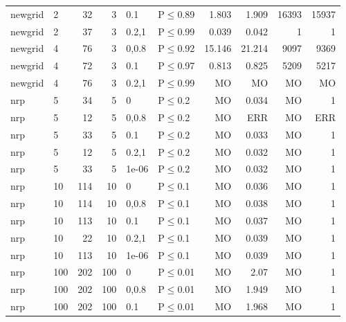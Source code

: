 \begin{longtable}{llrrllrrrr}
 newgrid       & 2        &     	32 &   3 & 0.1   & P$\leq$0.89  & 1.803    & 1.909   & 16393   & 15937   \\
 newgrid       & 2        &     	37 &   3 & 0.2,1 & P$\leq$0.99  & 0.039    & 0.042   & 1       & 1       \\
 newgrid       & 4        &     	76 &   3 & 0,0.8 & P$\leq$0.92  & 15.146   & 21.214  & 9097    & 9369    \\
 newgrid       & 4        &     	72 &   3 & 0.1   & P$\leq$0.97  & 0.813    & 0.825   & 5209    & 5217    \\
 newgrid       & 4        &     	76 &   3 & 0.2,1 & P$\leq$0.99  & MO       & MO      & MO      & MO      \\
 nrp           & 5        &     	34 &   5 & 0     & P$\leq$0.2   & MO       & 0.034   & MO      & 1       \\
 nrp           & 5        &     	12 &   5 & 0,0.8 & P$\leq$0.2   & MO       & ERR     & MO      & ERR     \\
 nrp           & 5        &     	33 &   5 & 0.1   & P$\leq$0.2   & MO       & 0.033   & MO      & 1       \\
 nrp           & 5        &     	12 &   5 & 0.2,1 & P$\leq$0.2   & MO       & 0.032   & MO      & 1       \\
 nrp           & 5        &     	33 &   5 & 1e-06 & P$\leq$0.2   & MO       & 0.032   & MO      & 1       \\
 nrp           & 10       &    	114 &  10 & 0     & P$\leq$0.1   & MO       & 0.036   & MO      & 1       \\
 nrp           & 10       &    	114 &  10 & 0,0.8 & P$\leq$0.1   & MO       & 0.038   & MO      & 1       \\
 nrp           & 10       &    	113 &  10 & 0.1   & P$\leq$0.1   & MO       & 0.037   & MO      & 1       \\
 nrp           & 10       &     	22 &  10 & 0.2,1 & P$\leq$0.1   & MO       & 0.039   & MO      & 1       \\
 nrp           & 10       &    	113 &  10 & 1e-06 & P$\leq$0.1   & MO       & 0.039   & MO      & 1       \\
 nrp           & 100      &    	202 & 100 & 0     & P$\leq$0.01  & MO       & 2.07    & MO      & 1       \\
 nrp           & 100      &    	202 & 100 & 0,0.8 & P$\leq$0.01  & MO       & 1.949   & MO      & 1       \\
 nrp           & 100      &    	202 & 100 & 0.1   & P$\leq$0.01  & MO       & 1.968   & MO      & 1       \\

\end{longtable}

